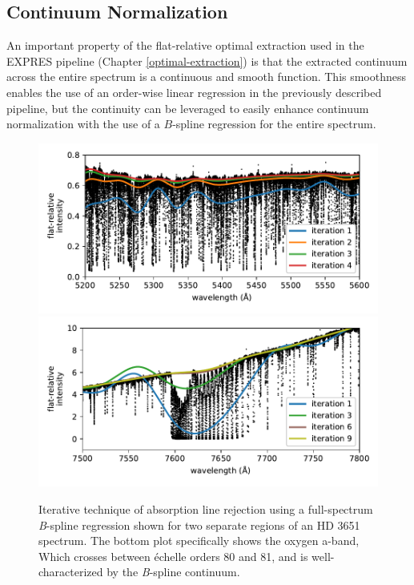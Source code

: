 \subsection{Continuum Normalization} \label{pipeline2:bspline:cont-norm}

An important property of the flat-relative optimal extraction used in the EXPRES pipeline (Chapter \ref{optimal-extraction}) is that the extracted continuum across the entire spectrum is a continuous and smooth function. This smoothness enables the use of an order-wise linear regression in the previously described pipeline, but the continuity can be leveraged to easily enhance continuum normalization with the use of a $B$-spline regression for the entire spectrum.

\begin{figure}
    \centering
    \includegraphics[width=\textwidth]{figures-5/cont-norm-bspline.pdf}
    \includegraphics[width=\textwidth]{figures-5/cont-norm-bspline-oxygen.pdf}
    \caption{Iterative technique of absorption line rejection using a full-spectrum \textit{B}-spline regression shown for two separate regions of an HD 3651 spectrum. The bottom plot specifically shows the oxygen a-band, Which crosses between \'echelle orders 80 and 81, and is well-characterized by the \textit{B}-spline continuum.}
    \label{fig:cont-norm-bspline}
\end{figure}

